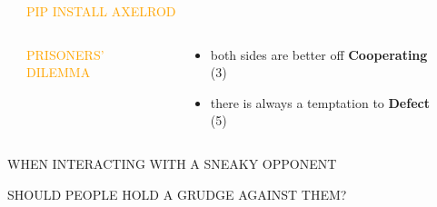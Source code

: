 \documentclass[usenames,dvipsnames,t]{beamer}
\begin{document}
\begin{frame}[fragile]

\begin{columns}
  \begin{column}{.03\linewidth}
  \end{column}
  \begin{column}{.45\linewidth}
   \vspace{1cm}

    \centering
    {\fontsize{120}{130}\selectfont\textcolor{orange}{PIP \hspace{2.5cm} INSTALL \hspace{2cm} AXELROD}}

  \begin{columns}
  \begin{column}{.40\linewidth}

   \vspace{1cm}

    \centering
    \textcolor{orange}{\LARGE{PRISONERS' DILEMMA}}
  \end{column}
  \begin{column}{.55\linewidth}
    \large{
    \begin{itemize}
      \item both sides are better off \textbf{Cooperating} (3)
      \item there is always a temptation to \textbf{Defect} (5)
    \end{itemize}
    }
    \end{column}
    \end{columns}
  \end{column}
  \begin{column}{.30\linewidth}

 \hspace{9cm}  
  \end{column}
  \end{columns}
  \begin{columns}
    \begin{column}{.25\linewidth}

   \vspace{1cm}

\begin{center}
\Large{\textcolor{red!80}{WHEN INTERACTING WITH A SNEAKY OPPONENT}}
\end{center}
\begin{center}
\Large{\textcolor{red!80}{SHOULD PEOPLE HOLD A GRUDGE AGAINST THEM?}}
\end{center}


\end{column}
\end{columns}
\end{frame}
\end{document}
